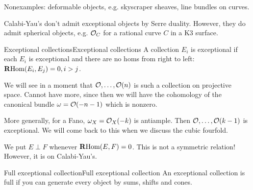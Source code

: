 Nonexamples: deformable objects, e.g. skyscraper sheaves, line bundles on curves.

\begin{remark}{}{}
    Calabi-Yau's don't admit exceptional objects by Serre duality. However, they do admit spherical objects, e.g. $\mathcal{O}_C$ for a rational curve $C$ in a K3 surface.
\end{remark}

\begin{definition}{Exceptional collections}{Exceptional collections}
    A collection $E_i$ is exceptional if each $E_i$ is exceptional and there are no homs from right to left: $\operatorname{\mathbf{R} Hom}(E_i,E_j)=0, i>j$.
\end{definition}

We will see in a moment that $\mathcal{O},\dots,\mathcal{O}(n)$ is such a collection on projective space. Cannot have more, since then we will have the cohomology of the canonical bundle $\omega=\mathcal{O}(-n-1)$ which is nonzero.

More generally, for a Fano, $\omega_X=\mathcal{O}_X(-k)$ is antiample. Then $\mathcal{O},\dots,\mathcal{O}(k-1)$ is exceptional. We will come back to this when we discuss the cubic fourfold.


We put $E \perp F$ whenever $\operatorname{\mathbf{R} Hom}(E,F)=0$. This is not a symmetric relation! However, it is on Calabi-Yau's.

\begin{definition}{Full exceptional collection}{Full exceptional collection}
    An exceptional collection is full if you can generate every object by sums, shifts and cones.
\end{definition}


